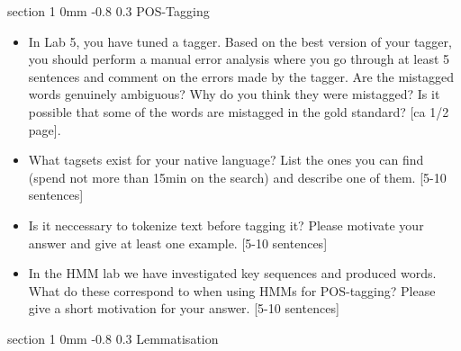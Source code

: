 \documentclass[11pt]{article}
\makeatletter
\newcommand{\newsec}[1]{\section{#1}\noindent}
\renewcommand{\section}{\@startsection
{section}%
{1}%
{0mm}%
{-0.8\baselineskip}%
{0.3\baselineskip}%
{\bfseries\large}}%
\makeatother
\begin{document}
\newsec{POS-Tagging}%
\begin{itemize}
\item In Lab 5, you have tuned a tagger. Based on the best version of
  your tagger, you should perform a manual error analysis where you go
  through at least 5 sentences and comment on the errors made by the
  tagger. Are the mistagged words genuinely ambiguous? Why do you
  think they were mistagged? Is it possible that some of the words are
  mistagged in the gold standard? \textcolor{UUred}{[ca 1/2 page]}.
\item What tagsets exist for your native language? List the ones you
  can find (spend not more than 15min on the search) and describe one
  of them. \textcolor{UUred}{[5-10
    sentences]} %
\item Is it neccessary to tokenize text before tagging it? Please
  motivate your answer and give at least one
  example. \textcolor{UUred}{[5-10
    sentences]} %
\item In the HMM lab we have investigated key sequences and produced
  words. What do these correspond to when using HMMs for POS-tagging?
  Please give a short motivation for your
  answer. \textcolor{UUred}{[5-10 sentences]}
\end{itemize}


\newsec{Lemmatisation}%
\end{document}
